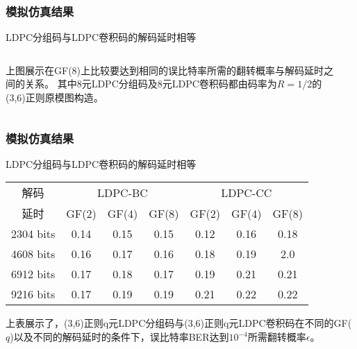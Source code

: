 \documentclass{beamer}
\begin{document}
\begin{frame}[shrink]
    \frametitle{模拟仿真结果}
        \begin{block}{LDPC分组码与LDPC卷积码的解码延时相等}
        \begin{columns}
        \begin{column}{0.4\textwidth}
        上图展示在GF($8$)上比较要达到相同的误比特率所需的翻转概率与解码延时之间的关系。
其中8元LDPC分组码及8元LDPC卷积码都由码率为$R=1/2$的(3,6)正则原模图构造。
        \end{column}
        \begin{column}{0.6\textwidth}
        \begin{center}
\end{center}
        \end{column}
        \end{columns}
        \end{block}
\end{frame}
\begin{frame}[shrink]
    \frametitle{模拟仿真结果}
        \begin{block}{LDPC分组码与LDPC卷积码的解码延时相等}
        \begin{center}
        \begin{tabular}{|c|c|c|c|c|c|c|}
 \hline
解码 & \multicolumn{3}{|c|}{LDPC-BC} & \multicolumn{3}{|c|}{LDPC-CC} \\ \cline{2-7}
延时 & GF(2) & GF(4) & GF(8) & GF(2) & GF(4) & GF(8) \\ \hline
2304 bits & 0.14 & 0.15 & 0.15 & 0.12 & 0.16 & 0.18\\ \hline
4608 bits & 0.16 & 0.17 & 0.16 & 0.18 & 0.19 & 2.0\\ \hline
6912 bits & 0.17 & 0.18 & 0.17 & 0.19 & 0.21 & 0.21\\ \hline
9216 bits & 0.17 & 0.19 & 0.19 & 0.21 & 0.22 & 0.22\\ \hline
\end{tabular}
\end{center}
上表展示了，(3,6)正则q元LDPC分组码与(3,6)正则q元LDPC卷积码在不同的GF($q$)以及不同的解码延时的条件下，误比特率BER达到$10^{-4}$所需翻转概率$\epsilon$。
        \end{block}
\end{frame}
\end{document}
